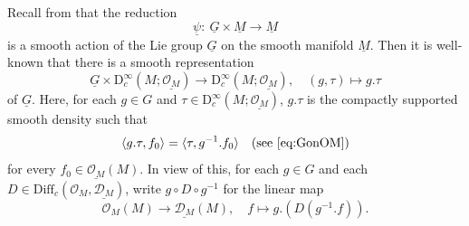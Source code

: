 \documentclass[12pt, a4paper]{amsart}
\newcommand{\CO}{{\mathcal {O}}}
\newcommand{\RD}{{\mathrm {D}}}
\newcommand{\la}{\langle}
\newcommand{\ra}{\rangle}
\newcommand{\be}{\begin {equation}}
\newcommand{\ee}{\end {equation}}
\theoremstyle{Theorem}
\theoremstyle{Theorem}
\theoremstyle{Theorem}
\theoremstyle{Theorem}
\theoremstyle{Plain}
\theoremstyle{remark}
\theoremstyle{remark}
\theoremstyle{Definition}
\numberwithin{equation}{section}
\begin{document}
Recall from \cite[Section 4.1]{CSW2} that the reduction 
\[\underline{\psi}:\ \underline{G}\times\underline{M}\rightarrow \underline{M}\] is a smooth action of the Lie group $\underline{G}$ on the smooth manifold $\underline{M}$. Then it is well-known that there is a smooth representation
\be \label{eq:Gondensity}\underline{G}\times \RD^{\infty}_c(M;\underline{\CO_M})\rightarrow \RD^{\infty}_c(M;\underline{\CO_M}), \quad (g,\tau)\mapsto g.\tau\ee of $\underline G$. Here, for each $g\in G$ and $\tau\in \RD^{\infty}_c(M;\underline{\CO_M})$, $g.\tau$ is the compactly supported smooth density such that 
\[\la g.\tau,f_0\ra=\la\tau,g^{-1}.f_0\ra \quad \text{(see \eqref{eq:GonOM})}\] for every $f_0\in \underline{\CO_M}(M)$.
In view of this, 
for each $g\in G$ and each $D %
\in\mathrm{Diff}_c(\CO_M,\underline{\mathcal{D}_M})$, write $g\circ D\circ g^{-1}$ for the linear map  \[ \CO_M(M)\rightarrow \underline{\mathcal{D}_M}(M), \quad f\mapsto  g.(D(g^{-1}.f)).\]
\end{document}

